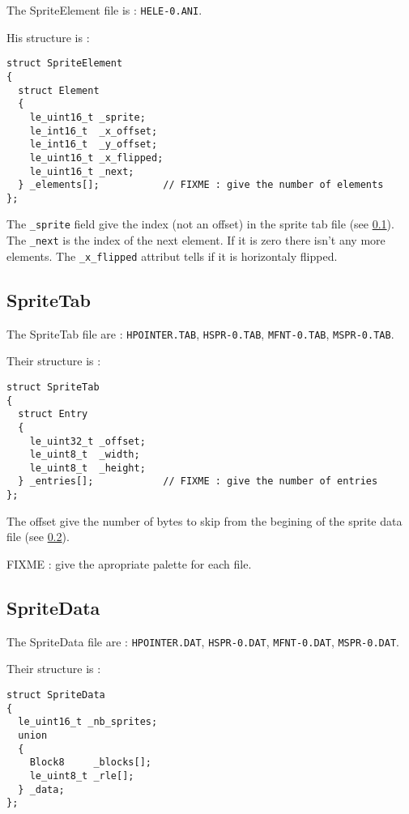 \documentclass[a4paper,twoside,12pt,dvips]{article}
\begin{document}
The SpriteElement file is : \texttt{HELE-0.ANI}.

His structure is :

\begin{lstlisting}
struct SpriteElement
{
  struct Element
  {
    le_uint16_t _sprite;
    le_int16_t  _x_offset;
    le_int16_t  _y_offset;
    le_uint16_t _x_flipped;
    le_uint16_t _next;
  } _elements[];           // FIXME : give the number of elements
};
\end{lstlisting}

The \texttt{\_sprite} field give the index (not an offset) in the sprite tab file (see \ref{sec:spritetab}). The \texttt{\_next} is the index of the next element. If it is zero there isn't any more elements. The \texttt{\_x\_flipped} attribut tells if it is horizontaly flipped.

\subsection{SpriteTab}
\label{sec:spritetab}

The SpriteTab file are : \texttt{HPOINTER.TAB}, \texttt{HSPR-0.TAB}, \texttt{MFNT-0.TAB}, \texttt{MSPR-0.TAB}.

Their structure is :

\begin{lstlisting}
struct SpriteTab
{
  struct Entry
  {
    le_uint32_t _offset;
    le_uint8_t  _width;
    le_uint8_t  _height;
  } _entries[];            // FIXME : give the number of entries
};
\end{lstlisting}

The offset give the number of bytes to skip from the begining of the sprite data file (see \ref{sec:spritedata}).

FIXME : give the apropriate palette for each file.

\subsection{SpriteData}
\label{sec:spritedata}

The SpriteData file are : \texttt{HPOINTER.DAT}, \texttt{HSPR-0.DAT}, \texttt{MFNT-0.DAT}, \texttt{MSPR-0.DAT}.

Their structure is :

\begin{lstlisting}
struct SpriteData
{
  le_uint16_t _nb_sprites;
  union
  {
    Block8     _blocks[];
    le_uint8_t _rle[];
  } _data;
};
\end{lstlisting}
\end{document}
